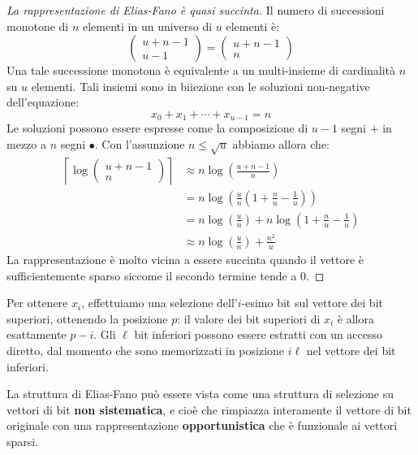 \documentclass[\main/main.tex]{subfiles}
\begin{document}
\begin{proof}[La rappresentazione di Elias-Fano è quasi succinta]
    Il numero di successioni monotone di \(n\) elementi in un universo di \(u\) elementi è:
    \[
        \left(\begin{array}{c}{u+n-1} \\ {u-1}\end{array}\right)=\left(\begin{array}{c}{u+n-1} \\ {n}\end{array}\right)
    \]
    Una tale successione monotona è equivalente a un multi-insieme di cardinalità \(n\) su \(u\) elementi. Tali insiemi sono in biiezione con le soluzioni non-negative dell'equazione:
    \[
        x_{0}+x_{1}+\cdots+x_{u-1}=n
    \]
    Le soluzioni possono essere espresse come la composizione di \(u-1\) segni \(+\) in mezzo a \(n\) segni \(\bullet\). Con l'assunzione \(n \leq \sqrt{u}\) abbiamo allora che:
    \begin{align*}
        \left\lceil\log \left(\begin{array}{c}{u+n-1} \\ {n}\end{array}\right)\right\rceil &\approx n \log \left(\frac{u+n-1}{n}\right) \\
        &=n \log \left(\frac{u}{n}\left(1+\frac{n}{u}-\frac{1}{u}\right)\right)\\
        &=n \log \left(\frac{u}{n}\right)+n \log \left(1+\frac{n}{u}-\frac{1}{u}\right)\\
        &\approx n \log \left(\frac{u}{n}\right)+\frac{n^{2}}{u}
    \end{align*}
    La rappresentazione è molto vicina a essere succinta quando il vettore è sufficientemente sparso siccome il secondo termine tende a \(0\).
\end{proof}
\clearpage
\begin{definition}
    Per ottenere \(x_i\), effettuiamo una selezione dell'\(i\)-esimo bit sul vettore dei bit superiori, ottenendo la posizione \(p\): il valore dei bit superiori di \(x_i\) è allora esattamente \(p-i\). Gli \(\ell\) bit inferiori possono essere estratti con un accesso diretto, dal momento che sono memorizzati in posizione \(i\ell\) nel vettore dei bit inferiori.
\end{definition}
\begin{observation}
    La struttura di Elias-Fano può essere vista come una struttura di selezione su vettori di bit \textbf{non sistematica}, e cioè che rimpiazza interamente il vettore di bit originale con una rappresentazione \textbf{opportunistica} che è funzionale ai vettori sparsi.
\end{observation}
\end{document}
